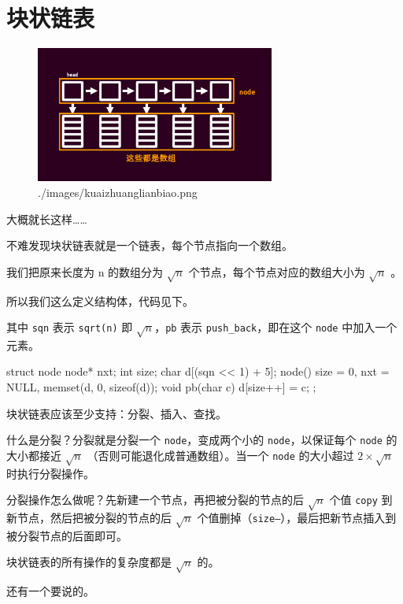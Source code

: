
\section{块状链表}

 \begin{figure}[htbp]
\centering
\includegraphics[width=0.7\textwidth]{docs/ds/images/kuaizhuanglianbiao.png} 
\caption{./images/kuaizhuanglianbiao.png}
\end{figure} 

大概就长这样……

不难发现块状链表就是一个链表，每个节点指向一个数组。

我们把原来长度为 n 的数组分为 $\sqrt{n}$ 个节点，每个节点对应的数组大小为 $\sqrt{n}$ 。

所以我们这么定义结构体，代码见下。

其中 \texttt{sqn} 表示 \texttt{sqrt(n)} 即 $\sqrt{n}$，\texttt{pb} 表示 \texttt{push\_back}，即在这个 \texttt{node} 中加入一个元素。

\begin{cppcode}
struct node {
  node* nxt;
  int size;
  char d[(sqn << 1) + 5];
  node() { size = 0, nxt = NULL, memset(d, 0, sizeof(d)); }
  void pb(char c) { d[size++] = c; }
};
\end{cppcode}

块状链表应该至少支持：分裂、插入、查找。

什么是分裂？分裂就是分裂一个 \texttt{node}，变成两个小的 \texttt{node}，以保证每个 \texttt{node} 的大小都接近 $\sqrt{n}$ （否则可能退化成普通数组）。当一个 \texttt{node} 的大小超过 $2\times \sqrt{n}$ 时执行分裂操作。

分裂操作怎么做呢？先新建一个节点，再把被分裂的节点的后 $\sqrt{n}$ 个值 \texttt{copy} 到新节点，然后把被分裂的节点的后 $\sqrt{n}$ 个值删掉（\texttt{size--}），最后把新节点插入到被分裂节点的后面即可。

块状链表的所有操作的复杂度都是 $\sqrt{n}$ 的。

还有一个要说的。

